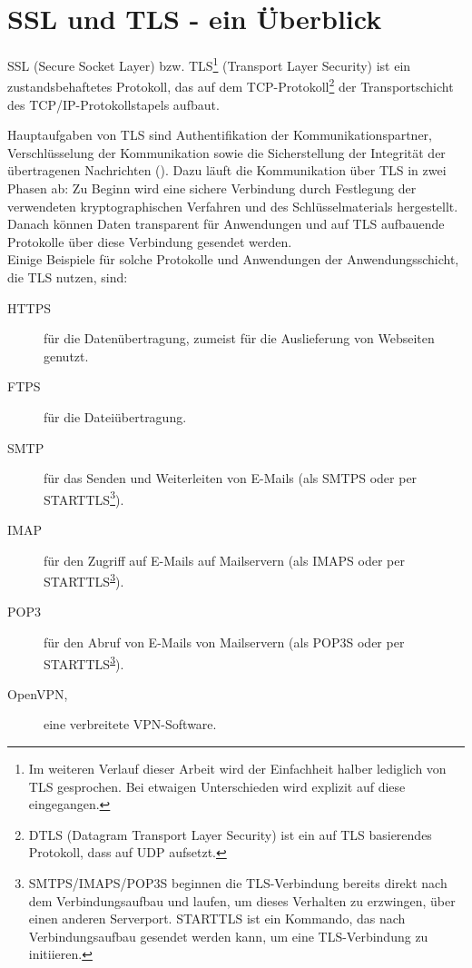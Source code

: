 \chapter{SSL und TLS - ein Überblick}

SSL (Secure Socket Layer) bzw. TLS\footnote{Im weiteren Verlauf dieser Arbeit wird der Einfachheit halber lediglich von TLS gesprochen. Bei etwaigen Unterschieden wird explizit auf diese eingegangen.} (Transport Layer Security) ist ein zustandsbehaftetes Protokoll, das auf dem TCP-Protokoll\footnote{DTLS (Datagram Transport Layer Security) ist ein auf TLS basierendes Protokoll, dass auf UDP aufsetzt.} der Transportschicht des TCP/IP-Protokollstapels aufbaut. 

Hauptaufgaben von TLS sind Authentifikation der Kommunikationspartner, Verschlüsselung der Kommunikation sowie die Sicherstellung der Integrität der übertragenen Nachrichten (\cite{meyer14}). Dazu läuft die Kommunikation über TLS in zwei Phasen ab: Zu Beginn wird eine sichere Verbindung durch Festlegung der verwendeten kryptographischen Verfahren und des Schlüsselmaterials hergestellt. Danach können Daten transparent für Anwendungen und auf TLS aufbauende Protokolle über diese Verbindung gesendet werden.\\
Einige Beispiele für solche Protokolle und Anwendungen der Anwendungsschicht, die TLS nutzen, sind:
\begin{description}
\item[HTTPS] für die Datenübertragung, zumeist für die Auslieferung von Webseiten genutzt. 
\item[FTPS] für die Dateiübertragung.
\item[SMTP] für das Senden und Weiterleiten von E-Mails (als SMTPS oder per STARTTLS\footnote{\label{fn_starttls}SMTPS/IMAPS/POP3S beginnen die TLS-Verbindung bereits direkt nach dem Verbindungsaufbau und laufen, um dieses Verhalten zu erzwingen, über einen anderen Serverport. STARTTLS ist ein Kommando, das nach Verbindungsaufbau gesendet werden kann, um eine TLS-Verbindung zu initiieren.}).
\item[IMAP] für den Zugriff auf E-Mails auf Mailservern (als IMAPS oder per STARTTLS\textsuperscript{\ref{fn_starttls}}).
\item[POP3] für den Abruf von E-Mails von Mailservern (als POP3S oder per STARTTLS\textsuperscript{\ref{fn_starttls}}).
\item[OpenVPN,] eine verbreitete VPN-Software.
\end{description}

